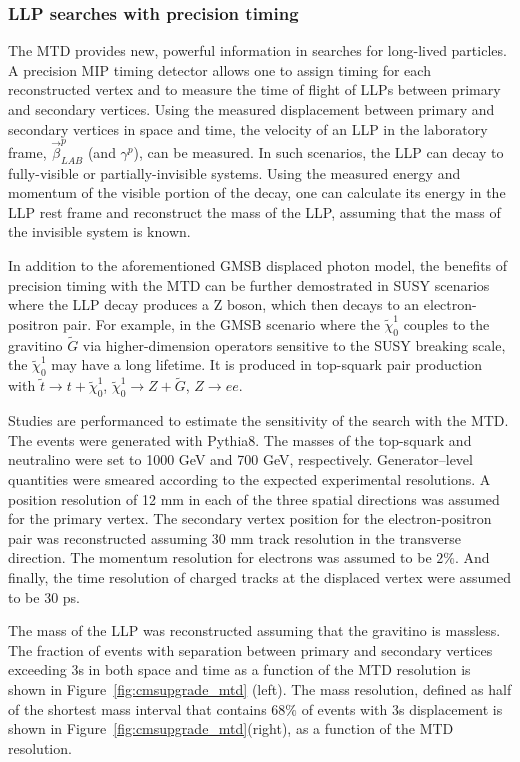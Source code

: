 \subsubsection{LLP searches with precision timing}

The MTD provides new, powerful information in searches for long-lived particles. 
A precision MIP timing detector allows one to assign timing for each reconstructed vertex and to measure the time of flight of LLPs between primary and secondary vertices. 
Using the measured displacement between primary and secondary vertices in space and time, the velocity of an LLP in
the laboratory frame, $\vec{\beta}_{LAB}^{p}$ (and $\gamma^p$), can be measured. In such scenarios, the LLP can decay to fully-visible or partially-invisible systems. 
Using the measured energy and momentum of the visible portion of the decay, one can calculate its energy in the LLP rest frame and reconstruct the mass of the LLP, assuming that the mass of the invisible system is known. 

In addition to the aforementioned GMSB displaced photon model, the benefits of precision timing with the MTD can be further demostrated in SUSY scenarios where the LLP decay produces a Z boson, which then decays to an electron-positron pair.
For example, in the GMSB scenario where the $\tilde{\chi}_0^1$ couples
to the gravitino $\tilde{G}$ via higher-dimension operators sensitive to the SUSY breaking scale, the $\tilde{\chi}_0^1$ may have a long lifetime. 
It is produced in top-squark pair production with 
$\tilde{t}\to t+\tilde{\chi}_0^1$, $\tilde{\chi}_0^1 \to Z+\tilde{G}$, $Z\to ee$.

Studies are performanced to estimate the sensitivity of the search with the MTD.
The events were generated with Pythia8. The masses of the top-squark and neutralino were set to 1000 GeV and 700 GeV, respectively. 
Generator–level quantities were smeared according to the expected experimental resolutions. 
A position resolution of 12 mm in each of the three spatial directions was assumed for the primary vertex.
 The secondary vertex position for the electron-positron pair was reconstructed assuming 30 mm track resolution in the transverse direction. 
The momentum resolution for electrons was assumed to be $2\%$. 
And finally, the time resolution of charged tracks at the displaced vertex were assumed to be 30 ps.

The mass of the LLP was reconstructed assuming that the gravitino is massless. The fraction of events with separation between primary and secondary
vertices exceeding 3s in both space and time as a function of the MTD resolution is shown in
Figure~\ref{fig:cmsupgrade_mtd} (left). The mass resolution, defined as half of the shortest mass interval that contains $68\%$ of events with 3s displacement is shown in Figure~\ref{fig:cmsupgrade_mtd}(right), 
as a function of the MTD resolution. 

